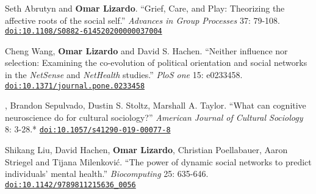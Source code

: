 \ind Seth Abrutyn and {\bf Omar Lizardo}. ``Grief, Care, and Play: Theorizing the affective roots of the social self.'' {\em Advances in Group Processes} 37: 79-108.  \href{https://doi.org/10.1108/S0882-614520200000037004}{\nolinkurl{doi:10.1108/S0882-614520200000037004}}

\ind Cheng Wang, {\bf Omar Lizardo} and David S. Hachen. ``Neither influence nor selection: Examining the co-evolution of political orientation and social networks in the {\em NetSense} and {\em NetHealth} studies.'' {\em PloS one} 15: e0233458. \href{https://doi.org/10.1371/journal.pone.0233458}{\nolinkurl{doi:10.1371/journal.pone.0233458}}

, Brandon Sepulvado, Dustin S. Stoltz, Marshall A. Taylor. ``What can cognitive neuroscience do for cultural sociology?'' {\em American Journal of Cultural Sociology} 8: 3-28.\textcolor{uclablue}{*} \newline\href{https://doi.org/10.1057/s41290-019-00077-8}{\nolinkurl{doi:10.1057/s41290-019-00077-8}}

\ind Shikang Liu, David Hachen, {\bf Omar Lizardo}, Christian Poellabauer, Aaron Striegel and Tijana Milenkovi\'{c}. ``The power of dynamic social networks to predict individuals' mental health.'' {\em Biocomputing} 25: 635-646. \href{https://doi.org/10.1142/9789811215636_0056}{\nolinkurl{doi:10.1142/9789811215636_0056}}
\medskip